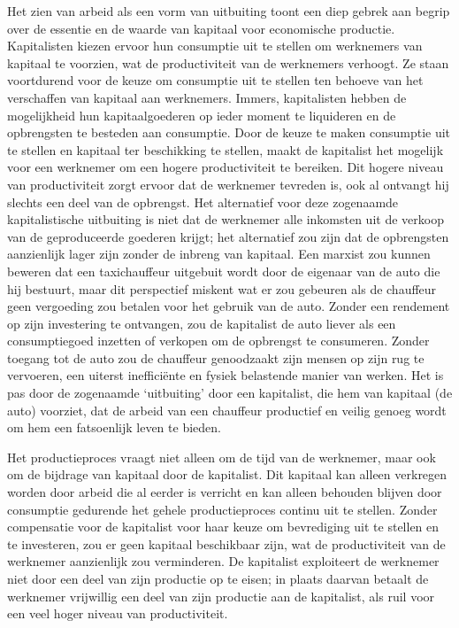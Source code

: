 \documentclass[
  a5paper,
  smalldemyvopaper,11pt,twoside,onecolumn,openright,extrafontsizes,
hidelinks]{memoir}
\begin{document}
Het zien van arbeid als een vorm van uitbuiting toont een diep gebrek
aan begrip over de essentie en de waarde van kapitaal voor economische
productie. Kapitalisten kiezen ervoor hun consumptie uit te stellen om
werknemers van kapitaal te voorzien, wat de productiviteit van de
werknemers verhoogt. Ze staan voortdurend voor de keuze om consumptie
uit te stellen ten behoeve van het verschaffen van kapitaal aan
werknemers. Immers, kapitalisten hebben de mogelijkheid hun
kapitaalgoederen op ieder moment te liquideren en de opbrengsten te
besteden aan consumptie. Door de keuze te maken consumptie uit te
stellen en kapitaal ter beschikking te stellen, maakt de kapitalist het
mogelijk voor een werknemer om een hogere productiviteit te bereiken.
Dit hogere niveau van productiviteit zorgt ervoor dat de werknemer
tevreden is, ook al ontvangt hij slechts een deel van de opbrengst. Het
alternatief voor deze zogenaamde kapitalistische uitbuiting is niet dat
de werknemer alle inkomsten uit de verkoop van de geproduceerde goederen
krijgt; het alternatief zou zijn dat de opbrengsten aanzienlijk lager
zijn zonder de inbreng van kapitaal. Een marxist zou kunnen beweren dat
een taxichauffeur uitgebuit wordt door de eigenaar van de auto die hij
bestuurt, maar dit perspectief miskent wat er zou gebeuren als de
chauffeur geen vergoeding zou betalen voor het gebruik van de auto.
Zonder een rendement op zijn investering te ontvangen, zou de kapitalist
de auto liever als een consumptiegoed inzetten of verkopen om de
opbrengst te consumeren. Zonder toegang tot de auto zou de chauffeur
genoodzaakt zijn mensen op zijn rug te vervoeren, een uiterst
inefficiënte en fysiek belastende manier van werken. Het is pas door de
zogenaamde `uitbuiting' door een kapitalist, die hem van kapitaal (de
auto) voorziet, dat de arbeid van een chauffeur productief en veilig
genoeg wordt om hem een fatsoenlijk leven te bieden.

Het productieproces vraagt niet alleen om de tijd van de werknemer, maar
ook om de bijdrage van kapitaal door de kapitalist. Dit kapitaal kan
alleen verkregen worden door arbeid die al eerder is verricht en kan
alleen behouden blijven door consumptie gedurende het gehele
productieproces continu uit te stellen. Zonder compensatie voor de
kapitalist voor haar keuze om bevrediging uit te stellen en te
investeren, zou er geen kapitaal beschikbaar zijn, wat de productiviteit
van de werknemer aanzienlijk zou verminderen. De kapitalist exploiteert
de werknemer niet door een deel van zijn productie op te eisen; in
plaats daarvan betaalt de werknemer vrijwillig een deel van zijn
productie aan de kapitalist, als ruil voor een veel hoger niveau van
productiviteit.
\end{document}

